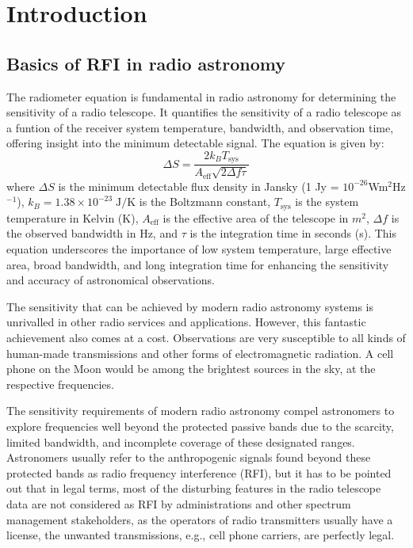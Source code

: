 \section{Introduction}
\label{section:hardware: introduction}


\subsection{Basics of RFI in radio astronomy}
The radiometer equation is fundamental in radio astronomy for determining the sensitivity of a radio telescope. It quantifies the sensitivity of a radio telescope as a funtion of the receiver system temperature, bandwidth, and observation time, offering insight into the minimum detectable signal. The equation is given by:
\[ \Delta S = \frac{2 k_B T_{\text{sys}}}{A_{\text{eff}} \sqrt{2 \Delta f \tau}} \]
where \( \Delta S \) is the minimum detectable flux density in Jansky (1 Jy = $10^{-26}$Wm$^2$Hz$^{-1}$), \( k_B =1.38 \times 10^{-23} \;\text{J} / \text{K}\) is the Boltzmann constant, \( T_{\text{sys}} \) is the system temperature in Kelvin (K), \( A_{\text{eff}} \) is the effective area of the telescope in $m^2$, \( \Delta f \) is the observed bandwidth in Hz, and \( \tau \) is the integration time in seconds (s). This equation underscores the importance of low system temperature, large effective area, broad bandwidth, and long integration time for enhancing the sensitivity and accuracy of astronomical observations.

The sensitivity that can be achieved by modern radio astronomy systems is unrivalled in other radio services and applications. However, this fantastic achievement also comes at a cost. Observations are very susceptible to all kinds of human-made transmissions and other forms of electromagnetic radiation. A cell phone on the Moon would be among the brightest sources in the sky, at the respective frequencies. 

The sensitivity requirements of modern radio astronomy compel astronomers to explore frequencies well beyond the protected passive bands due to the scarcity, limited bandwidth, and incomplete coverage of these designated ranges. Astronomers usually refer to the anthropogenic signals found beyond these protected bands as radio frequency interference (RFI), but it has to be pointed out that in legal terms, most of the disturbing features in the radio telescope data are not considered as RFI by administrations and other spectrum management stakeholders, as the operators of radio transmitters usually have a license, the unwanted transmissions, e.g., cell phone carriers, are perfectly legal. 

